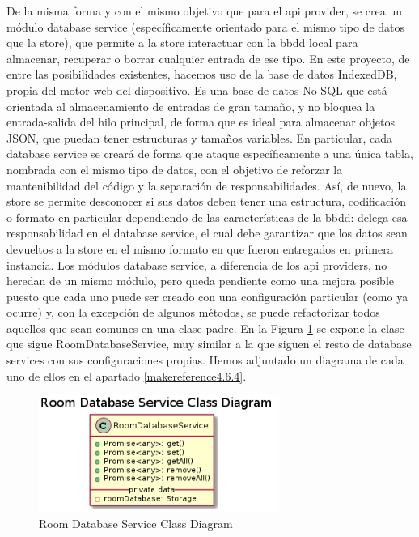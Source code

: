 \vspace{0.5cm}

De la misma forma y con el mismo objetivo que para el api provider, se crea un módulo database service (específicamente orientado para el mismo tipo de datos que la store), que permite a la store interactuar con la \gls{bbdd} local para almacenar, recuperar o borrar cualquier entrada de ese tipo. En este proyecto, de entre las posibilidades existentes, hacemos uso de la base de datos IndexedDB, propia del motor web del dispositivo. Es una base de datos No-SQL que está orientada al almacenamiento de entradas de gran tamaño, y no bloquea la entrada-salida del hilo principal, de forma que es ideal para almacenar objetos JSON, que puedan tener estructuras y tamaños variables. En particular, cada database service se creará de forma que ataque específicamente a una única tabla, nombrada con el mismo tipo de datos, con el objetivo de reforzar la mantenibilidad del código y la separación de responsabilidades. Así, de nuevo, la store se permite desconocer si sus datos deben tener una estructura, codificación o formato en particular dependiendo de las características de la \gls{bbdd}: delega esa responsabilidad en el database service, el cual debe garantizar que los datos sean devueltos a la store en el mismo formato en que fueron entregados en primera instancia. 
Los módulos database service, a diferencia de los api providers, no heredan de un mismo módulo, pero queda pendiente como una mejora posible puesto que cada uno puede ser creado con una configuración particular (como ya ocurre) y, con la excepción de algunos métodos, se puede refactorizar todos aquellos que sean comunes en una clase padre. En la Figura \ref{fig:database-service} se expone la clase que sigue RoomDatabaseService, muy similar a la que siguen el resto de database services con sus configuraciones propias. Hemos adjuntado un diagrama de cada uno de ellos en el apartado \ref{makereference4.6.4}.


\begin{figure}[hbt!]
\centering
\includegraphics[height=1.5in]{figures/diagrams/front/architecture/database-service.png}
\caption[app-data]{Room Database Service Class Diagram\footnotemark}
\label{fig:database-service}
\end{figure}

